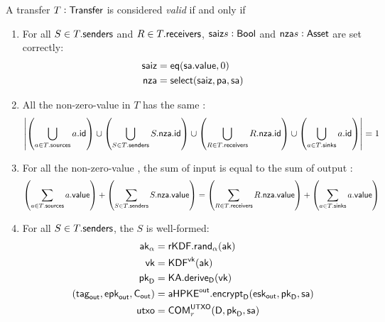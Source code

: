 \begin{definition}\label{def:transfer-validity-statement}
    A transfer $T : {\textsf{Transfer}}$ is considered \emph{valid} if and only if
    \begin{enumerate}
        \item For all $S \in T.{\textsf{senders}}$ and $R \in T.{\textsf{receivers}}$, ${\textsf{saiz}}{s}: {\textsf{Bool}}$ and ${\textsf{nza}}{s}: {\textsf{Asset}}$ are set correctly:
            \begin{align*}
                {\textsf{saiz}} &= {\textsf{eq}}({\textsf{sa}}.{\textsf{value}},0)  \\
                {\textsf{nza}}  &= {\textsf{select}}({\textsf{saiz}}, {\textsf{pa}}, {\textsf{sa}})
            \end{align*}
        \item All the non-zero-value  in $T$ has the same :
            \[
                \left|
                    \left(\bigcup_{a \in T.{\textsf{sources}}} a.{\textsf{id}} \right)
                    \cup
                    \left(\bigcup_{S \in T.{\textsf{senders}}} S.{\textsf{nza}}.{\textsf{id}} \right)
                    \cup
                    \left(\bigcup_{R \in T.{\textsf{receivers}}} R.{\textsf{nza}}.{\textsf{id}} \right)
                    \cup
                    \left(\bigcup_{a \in T.{\textsf{sinks}}} a.{\textsf{id}} \right)
                \right| = 1
            \]
        \item For all the non-zero-value , the sum of input  is equal to the sum of output :
            \[
                \left(\sum_{a \in T.{\textsf{sources}}} a.{\textsf{value}}\right)
                +
                \left(\sum_{S \in T.{\textsf{senders}}} S.{\textsf{nza}}.{\textsf{value}}\right)
                =
                \left(\sum_{R \in T.{\textsf{receivers}}} R.{\textsf{nza}}.{\textsf{value}}\right)
                +
                \left(\sum_{a \in T.{\textsf{sinks}}} a.{\textsf{value}}\right)
            \]
        \item For all $S \in T.{\textsf{senders}}$, the \Sender{} $S$ is well-formed:
            \begin{align*}
                \ak_\alpha                            &= \rKDF.\rand_\alpha(\ak) \\
                \vk                                   &= \KDF^\vk(\ak) \\
                \pkD                                  &= \KA.\derive_\textsf{D}(\vk) \\
                (\tagout, \epkout, \Cout)             &= \aHPKEout.\encrypt_\textsf{D}(\eskout, \pkD, \sa) \\
                \utxo                                   &= \COM^{\UTXO}_{r}(\textsf{D}, \pkD, \sa) \\

\end{align*}
\end{enumerate}
\end{definition}
